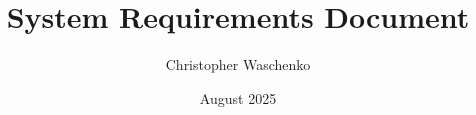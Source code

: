 \documentclass{article}
\begin{document}
\title{System Requirements Document}
\author{Christopher Waschenko}
\date{August 2025}
\end{document}

